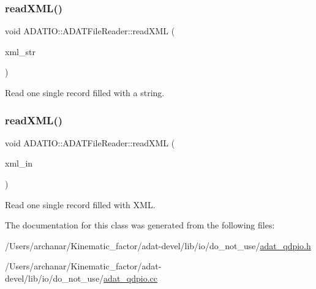\subsubsection{\texorpdfstring{readXML()}{readXML()}\hspace{0.1cm}{\footnotesize\ttfamily [1/2]}}
{\footnotesize\ttfamily void A\+D\+A\+T\+I\+O\+::\+A\+D\+A\+T\+File\+Reader\+::read\+X\+ML (\begin{DoxyParamCaption}\item[{std\+::string \&}]{xml\+\_\+str }\end{DoxyParamCaption})\hspace{0.3cm}{\ttfamily [protected]}}



Read one single record filled with a string. 

\mbox{\label{classADATIO_1_1ADATFileReader_ga9a1ac411577bd50e643f483119318893}} 
\subsubsection{\texorpdfstring{readXML()}{readXML()}\hspace{0.1cm}{\footnotesize\ttfamily [2/2]}}
{\footnotesize\ttfamily void A\+D\+A\+T\+I\+O\+::\+A\+D\+A\+T\+File\+Reader\+::read\+X\+ML (\begin{DoxyParamCaption}\item[{\mbox{\hyperlink{classADATXML_1_1XMLReader}{X\+M\+L\+Reader}} \&}]{xml\+\_\+in }\end{DoxyParamCaption})\hspace{0.3cm}{\ttfamily [protected]}}



Read one single record filled with X\+ML. 



The documentation for this class was generated from the following files\+:\begin{DoxyCompactItemize}
\item 
/\+Users/archanar/\+Kinematic\+\_\+factor/adat-\/devel/lib/io/do\+\_\+not\+\_\+use/\mbox{\hyperlink{adat-devel_2lib_2io_2do__not__use_2adat__qdpio_8h}{adat\+\_\+qdpio.\+h}}\item 
/\+Users/archanar/\+Kinematic\+\_\+factor/adat-\/devel/lib/io/do\+\_\+not\+\_\+use/\mbox{\hyperlink{adat-devel_2lib_2io_2do__not__use_2adat__qdpio_8cc}{adat\+\_\+qdpio.\+cc}}\end{DoxyCompactItemize}

